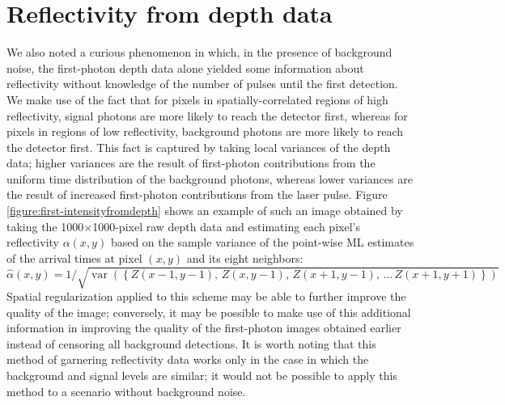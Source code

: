 \section{Reflectivity from depth data}
We also noted a curious phenomenon in which, in the presence of background noise, the first-photon depth data alone yielded some information about reflectivity without knowledge of the number of pulses until the first detection. We make use of the fact that for pixels in spatially-correlated regions of high reflectivity, signal photons are more likely to reach the detector first, whereas for pixels in regions of low reflectivity, background photons are more likely to reach the detector first. This fact is captured by taking local variances of the depth data; higher variances are the result of first-photon contributions from the uniform time distribution of the background photons, whereas lower variances are the result of increased first-photon contributions from the laser pulse. Figure \ref{figure:first-intensityfromdepth} shows an example of such an image obtained by taking the 1000$\times$1000-pixel raw depth data and estimating each pixel's reflectivity $\alpha(x,y)$ based on the sample variance of the point-wise ML estimates of the arrival times at pixel $(x,y)$ and its eight neighbors:
\begin{equation}
\hat{\alpha}(x,y) = 1 / \sqrt{\operatorname{var}\left(\left\{ Z(x-1, y-1),\,Z(x, y-1),\,Z(x+1,y-1),\,...\, Z(x+1,y+1)\right\}\right)}
\end{equation}
Spatial regularization applied to this scheme may be able to further improve the quality of the image; conversely, it may be possible to make use of this additional information in improving the quality of the first-photon images obtained earlier instead of censoring all background detections. It is worth noting that this method of garnering reflectivity data works only in the case in which the background and signal levels are similar; it would not be possible to apply this method to a scenario without background noise.

